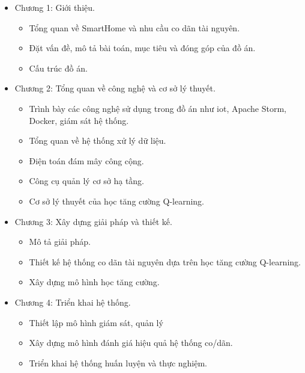 \begin{itemize}
    \item Chương 1: Giới thiệu.
          \begin{itemize}
              \item Tổng quan về SmartHome và nhu cầu co dãn tài nguyên.
              \item Đặt vấn đề, mô tả bài toán, mục tiêu và đóng góp của đồ án.
              \item Cấu trúc đồ án.
          \end{itemize}

    \item Chương 2: Tổng quan về công nghệ và cơ sở lý thuyết.
          \begin{itemize}
              \item Trình bày các công nghệ sử dụng trong đồ án như \gls{iot}, Apache Storm, Docker, giám sát hệ thống.
              \item Tổng quan về hệ thống xử lý dữ liệu.
              \item Điện toán đám mây công cộng.
              \item Công cụ quản lý cơ sở hạ tầng.
              \item Cơ sở lý thuyết của học tăng cường Q-learning.
          \end{itemize}

    \item Chương 3: Xây dựng giải pháp và thiết kế.
          \begin{itemize}
              \item Mô tả giải pháp.
              \item Thiết kế hệ thống co dãn tài nguyên dựa trên học tăng cường Q-learning.
              \item Xây dựng mô hình học tăng cường.
          \end{itemize}

    \item Chương 4: Triển khai hệ thống.
          \begin{itemize}
              \item Thiết lập mô hình giám sát, quản lý
              \item Xây dựng mô hình đánh giá hiệu quả hệ thống co/dãn.
              \item Triển khai hệ thống huấn luyện và thực nghiệm.
          \end{itemize}


\end{itemize}

